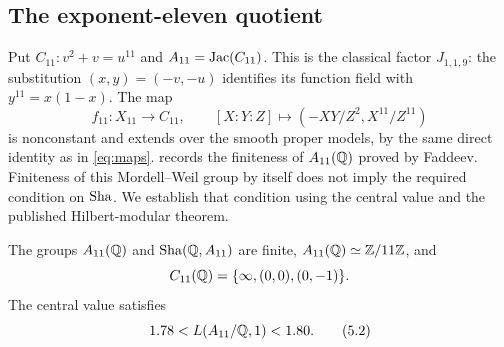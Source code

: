 \subsection{The exponent-eleven quotient}
\label{subsec:eleven}

Put $C_{11}:v^2+v=u^{11}$ and $A_{11}=\operatorname{Jac}(C_{11})$.
This is the classical factor $J_{1,1,9}$: the substitution
$(x,y)=(-v,-u)$ identifies its function field with
$y^{11}=x(1-x)$. The map
\[
f_{11}:X_{11}\longrightarrow C_{11},\qquad
[X:Y:Z]\longmapsto(-XY/Z^2,X^{11}/Z^{11})
\]
is nonconstant and extends over the smooth proper models, by the
same direct identity as in \eqref{eq:maps}.
\citet[\S4, table on p.~219]{GrossRohrlich1978} records the finiteness
of $A_{11}(\mathbb Q)$ proved by Faddeev. Finiteness of this Mordell--Weil
group by itself does not imply the required condition on $\operatorname{Sha}$.
We establish that condition using the central value and the published
Hilbert-modular theorem.

\begin{proposition}\label{prop:eleven}
The groups $A_{11}(\mathbb Q)$ and $\operatorname{Sha}(\mathbb Q,A_{11})$ are finite,
$A_{11}(\mathbb Q)\simeq\mathbb Z/11\mathbb Z$, and
\[
C_{11}(\mathbb Q)=\{\infty,(0,0),(0,-1)\}.
\]
The central value satisfies
\[
1.78<L(A_{11}/\mathbb Q,1)<1.80.
\tag{5.2}\label{eq:elevenvalue}
\]
\end{proposition}

